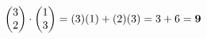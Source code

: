 \documentclass[preview]{standalone}
\begin{document}
\begin{align*}
\special{dvisvgm:raw <g id='unique000'>}\begin{pmatrix}3\\2\end{pmatrix} \cdot \begin{pmatrix}1\\3\end{pmatrix}= (3)(1) + (2)(3) = 3 + 6 = \mathbf{9}\special{dvisvgm:raw </g>}
\end{align*}
\end{document}
